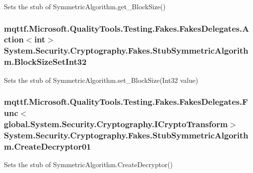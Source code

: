 Sets the stub of Symmetric\-Algorithm.\-get\-\_\-\-Block\-Size()

\hypertarget{class_system_1_1_security_1_1_cryptography_1_1_fakes_1_1_stub_symmetric_algorithm_a42ab06d00eb796075418c8724225b1f9}{
\subsubsection[{Block\-Size\-Set\-Int32}]{\setlength{\rightskip}{0pt plus 5cm}mqttf.\-Microsoft.\-Quality\-Tools.\-Testing.\-Fakes.\-Fakes\-Delegates.\-Action$<$int$>$ System.\-Security.\-Cryptography.\-Fakes.\-Stub\-Symmetric\-Algorithm.\-Block\-Size\-Set\-Int32}}\label{class_system_1_1_security_1_1_cryptography_1_1_fakes_1_1_stub_symmetric_algorithm_a42ab06d00eb796075418c8724225b1f9}


Sets the stub of Symmetric\-Algorithm.\-set\-\_\-\-Block\-Size(\-Int32 value)

\hypertarget{class_system_1_1_security_1_1_cryptography_1_1_fakes_1_1_stub_symmetric_algorithm_a0662dc69cbac0d6d972ac9e5374de936}{
\subsubsection[{Create\-Decryptor01}]{\setlength{\rightskip}{0pt plus 5cm}mqttf.\-Microsoft.\-Quality\-Tools.\-Testing.\-Fakes.\-Fakes\-Delegates.\-Func$<$global.\-System.\-Security.\-Cryptography.\-I\-Crypto\-Transform$>$ System.\-Security.\-Cryptography.\-Fakes.\-Stub\-Symmetric\-Algorithm.\-Create\-Decryptor01}}\label{class_system_1_1_security_1_1_cryptography_1_1_fakes_1_1_stub_symmetric_algorithm_a0662dc69cbac0d6d972ac9e5374de936}


Sets the stub of Symmetric\-Algorithm.\-Create\-Decryptor()


